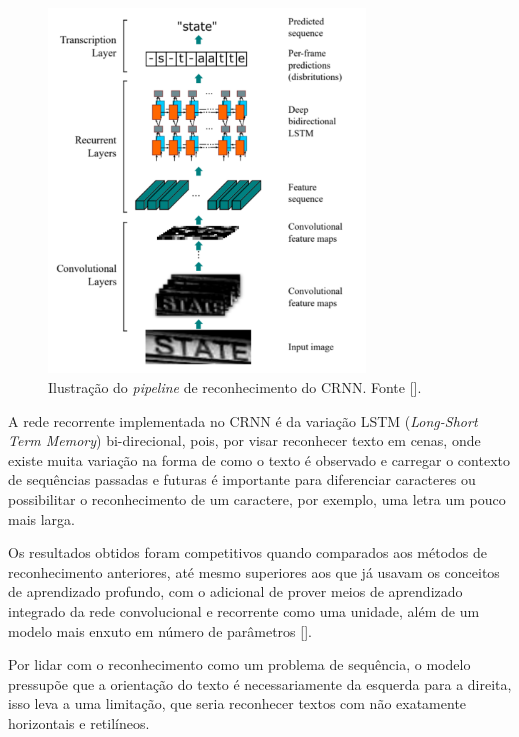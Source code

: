 \begin{figure}
    \centering
    \includegraphics[width=0.75\textwidth]{figs/crnn-pipeline.png}
    \caption{Ilustração do \textit{pipeline} de reconhecimento do CRNN. Fonte [].}
    \label{fig:crnn_pipeline}
\end{figure}

A rede recorrente implementada no CRNN é da variação LSTM (\textit{Long-Short Term Memory}) bi-direcional, pois, por visar reconhecer texto em cenas, 
onde existe muita variação na forma de como o texto é observado e carregar o contexto de sequências passadas e futuras é importante para diferenciar 
caracteres ou possibilitar o reconhecimento de um caractere, por exemplo, uma letra um pouco mais larga.

Os resultados obtidos foram competitivos quando comparados aos métodos de reconhecimento anteriores, até mesmo superiores aos que já usavam 
os conceitos de aprendizado profundo, com o adicional de prover meios de aprendizado integrado da rede convolucional e recorrente como uma unidade, 
além de um modelo mais enxuto em número de parâmetros [].

Por lidar com o reconhecimento como um problema de sequência, o modelo pressupõe que a orientação do texto é necessariamente da esquerda para a direita, 
isso leva a uma limitação, que seria reconhecer textos com não exatamente horizontais e retilíneos.

